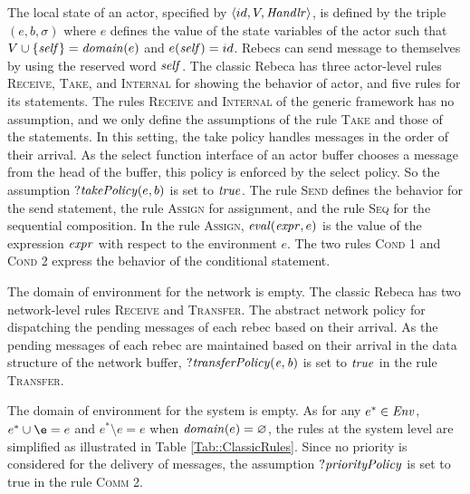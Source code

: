The local state of an actor, specified by $\langle id, V,\mathit{Handlr}\rangle$, is defined by the triple $(e,b,\sigma)$ where $e$ defines the value of the state variables of the actor such that $V\cup\{\mathit{self}\}=\mathit{domain}(e)$ and $e(\mathit{self})=id$. Rebecs can send message to themselves by using the reserved word $\it self$. The classic Rebeca has three actor-level rules \textsc{Receive}, \textsc{Take}, and \textsc{Internal} for showing the behavior of actor, and five rules for its statements. The rules \textsc{Receive} and \textsc{Internal} of the generic framework has no assumption, and we only define the assumptions of the rule \textsc{Take} and those of the statements. In this setting, the take policy handles messages in the order of their arrival. As the select function interface of an actor buffer chooses a message from the head of the buffer, this policy is enforced by the select policy. So the assumption $?{\it takePolicy}(e,b)$ is set to $\mathit{true}$. The rule \textsc{Send} defines the behavior for the send statement, the rule \textsc{Assign} for assignment, and the rule \textsc{Seq} for the sequential composition. In the rule \textsc{Assign}, $\mathit{eval}(\mathit{expr},e)$ is the value of the expression $\mathit{expr}$ with respect to the environment $e$. The two rules \textsc{Cond 1} and \textsc{Cond 2} express the behavior of the conditional statement. 

The domain of environment for the network is empty. The classic Rebeca has two network-level rules \textsc{Receive} and \textsc{Transfer}. %
The abstract network policy for dispatching the pending messages of each rebec based on their arrival. As the pending messages of each rebec are maintained based on their arrival in the data structure of the network buffer, $?{\it transferPolicy(e,b)}$ is set to $\mathit{true}$ in the rule \textsc{Transfer}.

The domain of environment for the system is empty. As for any $e^\ast\in\mathit{Env}$, $e^\ast\cup \e=e$ and $e^\ast\setminus e=e$ when $\mathit{domain}(e)=\varnothing$, the rules at the system level are simplified as illustrated in Table \ref{Tab::ClassicRules}. Since no priority is considered for the delivery of messages, the assumption $?{\it priorityPolicy}$ is set to true in the rule \textsc{Comm 2}.  %









